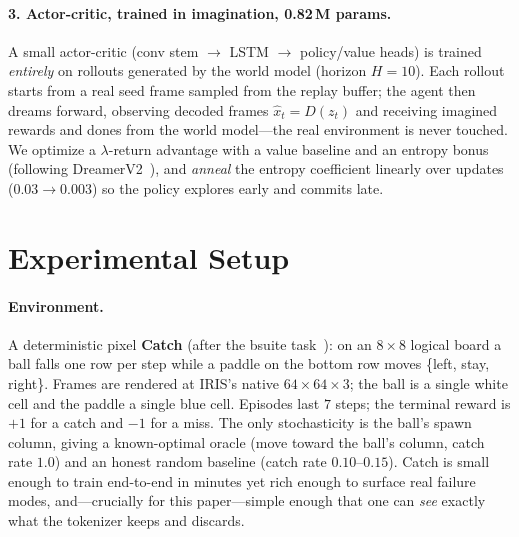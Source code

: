 \documentclass[11pt]{article}
\begin{document}
\paragraph{3. Actor-critic, trained in imagination, 0.82\,M params.}
A small actor-critic (conv stem $\to$ LSTM $\to$ policy/value heads) is trained
\emph{entirely} on rollouts generated by the world model (horizon $H{=}10$).
Each rollout starts from a real seed frame sampled from the replay buffer; the
agent then dreams forward, observing decoded frames $\hat x_t=D(z_t)$ and
receiving imagined rewards and dones from the world model---the real environment
is never touched. We optimize a $\lambda$-return advantage with a value baseline
and an entropy bonus (following DreamerV2~\cite{dreamerv2}), and \emph{anneal}
the entropy coefficient linearly over updates ($0.03\!\to\!0.003$) so the policy
explores early and commits late.

\section{Experimental Setup}
\label{sec:setup}
\paragraph{Environment.} A deterministic pixel \textbf{Catch} (after the bsuite
task~\cite{bsuite}): on an $8{\times}8$ logical board a ball falls one row per
step while a paddle on the bottom row moves \{left, stay, right\}. Frames are
rendered at IRIS's native $64{\times}64{\times}3$; the ball is a single white
cell and the paddle a single blue cell. Episodes last $7$ steps; the terminal
reward is $+1$ for a catch and $-1$ for a miss. The only stochasticity is the
ball's spawn column, giving a known-optimal oracle (move toward the ball's
column, catch rate $1.0$) and an honest random baseline (catch rate
$0.10$--$0.15$). Catch is small enough to train end-to-end in minutes yet rich
enough to surface real failure modes, and---crucially for this paper---simple
enough that one can \emph{see} exactly what the tokenizer keeps and discards.
\end{document}
